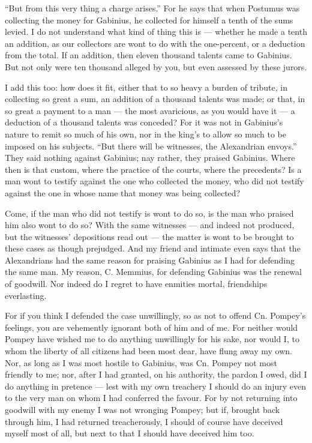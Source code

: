  ``But from this very thing a charge arises.'' For he says that when Postumus was collecting the money for Gabinius, he collected for himself a tenth of the sums levied. I do not understand what kind of thing this is --- whether he made a tenth an addition, as our collectors are wont to do with the one-percent, or a deduction from the total. If an addition, then eleven thousand talents came to Gabinius. But not only were ten thousand alleged by you, but even assessed by these jurors.

 I add this too: how does it fit, either that to so heavy a burden of tribute, in collecting so great a sum, an addition of a thousand talents was made; or that, in so great a payment to a man --- the most avaricious, as you would have it --- a deduction of a thousand talents was conceded? For it was not in Gabinius's nature to remit so much of his own, nor in the king's to allow so much to be imposed on his subjects. ``But there will be witnesses, the Alexandrian envoys.'' They said nothing against Gabinius; nay rather, they praised Gabinius. Where then is that custom, where the practice of the courts, where the precedents? Is a man wont to testify against the one who collected the money, who did not testify against the one in whose name that money was being collected?

 Come, if the man who did not testify is wont to do so, is the man who praised him also wont to do so? With the same witnesses --- and indeed not produced, but the witnesses' depositions read out --- the matter is wont to be brought to these cases as though prejudged. And my friend and intimate even says that the Alexandrians had the same reason for praising Gabinius as I had for defending the same man. My reason, C. Memmius, for defending Gabinius was the renewal of goodwill. Nor indeed do I regret to have enmities mortal, friendships everlasting.

 For if you think I defended the case unwillingly, so as not to offend Cn. Pompey's feelings, you are vehemently ignorant both of him and of me. For neither would Pompey have wished me to do anything unwillingly for his sake, nor would I, to whom the liberty of all citizens had been most dear, have flung away my own. Nor, as long as I was most hostile to Gabinius, was Cn. Pompey not most friendly to me; nor, after I had granted, on his authority, the pardon I owed, did I do anything in pretence --- lest with my own treachery I should do an injury even to the very man on whom I had conferred the favour. For by not returning into goodwill with my enemy I was not wronging Pompey; but if, brought back through him, I had returned treacherously, I should of course have deceived myself most of all, but next to that I should have deceived him too.

